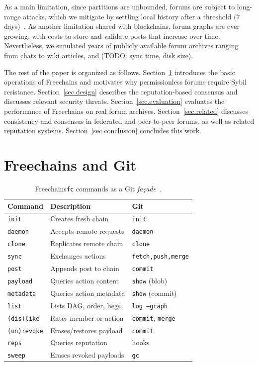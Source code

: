 \documentclass[10pt,twocolumn]{article}
\newcommand{\FC}       {Freechains\xspace}
\newcommand{\code}[1]  {\texttt{\small{#1}}}
\begin{document}
As a main limitation, since partitions are unbounded, forums are subject to
long-range attacks, which we mitigate by settling local history after a
threshold (7 days)~\cite{pos.weak}.
%
As another limitation shared with blockchains, forum graphs are ever growing,
with costs to store and validate posts that increase over time.
Nevertheless, we simulated years of publicly available forum archives ranging
from chats to wiki articles, and (TODO: sync time, disk size).

The rest of the paper is organized as follows.
Section~\ref{sec.git} introduces the basic operations of \FC and motivates why
permissionless forums require Sybil resistance.
Section~\ref{sec.design} describes the reputation-based consensus and discusses
relevant security threats.
Section~\ref{sec.evaluation} evaluates the performance of \FC on real forum
archives.
Section~\ref{sec.related} discusses consistency and consensus in federated and
peer-to-peer forums, as well as related reputation systems.
Section~\ref{sec.conclusion} concludes this work.

\section{\FC and Git}
\label{sec.git}

\begin{table}[t]
\centering
\footnotesize
\setlength{\tabcolsep}{3pt}
\begin{tabular}{@{}lll@{}}
\hline
\textbf{Command}   & \textbf{Description}        & \textbf{Git}                \\
\hline
\code{init}        & Creates fresh chain         & \code{init}                 \\
\code{daemon}      & Accepts remote requests     & \code{daemon}               \\
\code{clone}       & Replicates remote chain     & \code{clone}                \\
\code{sync}        & Exchanges actions           & \code{fetch,push,merge}     \\
\code{post}        & Appends post to chain       & \code{commit}               \\
\code{payload}     & Queries action content      & \code{show} (blob)          \\
\code{metadata}    & Queries action metadata     & \code{show} (commit)        \\
\code{list}        & Lists DAG, order, begs      & \code{log --graph}          \\
\code{(dis)like}   & Rates member or action      & \code{commit}, \code{merge} \\
\code{(un)revoke}  & Erases/restores payload     & \code{commit}               \\
\code{reps}        & Queries reputation          & hooks                       \\
\code{sweep}       & Erases revoked payloads     & \code{gc}                   \\
\hline
\end{tabular}
\caption{
    \FC \code{fc} commands as a Git \emph{façade}~\cite{design.patterns}.
}
\label{tab.commands}
\end{table}
\end{document}
